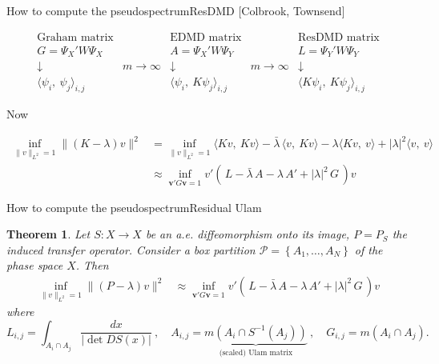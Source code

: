 \documentclass[
  english,            %
  aspectratio=169,    %
]{tumbeamer}
\newtheorem{theorem}{Theorem}
\newcommand{\cP}{\mathcal{P}}
\newcommand{\bv}{\mathbf{v}}
\begin{document}
\begin{frame}{How to compute the pseudospectrum}{ResDMD [Colbrook, Townsend]}
  
\begin{equation}
  \begin{matrix}
    \text{Graham matrix} & & \text{EDMD matrix} & & \text{ResDMD matrix} \\ 
    G = \Psi_X ' W \Psi_X &  &A = \Psi_X ' W \Psi_Y & &  L = \Psi_Y ' W \Psi_Y \\ 
    \downarrow & \scriptstyle{m \to \infty} & \downarrow & \scriptstyle{m \to \infty} & \downarrow \\ 
    \langle \psi_i,\ \psi_j \rangle_{i,j} & & \langle \psi_i,\ K\psi_j \rangle_{i,j} & & \langle K \psi_i,\ K \psi_j \rangle_{i,j}
  \end{matrix}
\end{equation}

Now

\begin{align}
  \inf_{\| v \|_{L^2} = 1} \| (K - \lambda) v \|^2 &= \inf_{\| v \|_{L^2} = 1} 
  \langle K v,\ K v \rangle - \bar{\lambda} \,\langle v,\ K v \rangle - \lambda \langle K v,\ v \rangle + |\lambda|^2 \langle v,\ v \rangle \\
  &\approx \inf_{\bv' G \bv = 1} v' (\, L - \bar{\lambda}\, A - \lambda\, A' + |\lambda|^2 \,G \,) v
\end{align}

\end{frame}

\begin{frame}{How to compute the pseudospectrum}{Residual Ulam}

\begin{theorem}
  Let $S : X \to X$ be an a.e. diffeomorphism onto its image, $P = P_S$ the induced transfer operator. Consider a box partition $\cP = \left\{ A_1, \ldots, A_N \right\}$ of the phase space $X$. Then 
  \begin{align}
    \inf_{\| v \|_{L^2} = 1} \| (P - \lambda) v \|^2 &\approx \inf_{\bv' G \bv = 1} v' (\, L - \bar{\lambda}\, A - \lambda\, A' + |\lambda|^2 \,G \,) v
  \end{align}
  where 
  \begin{equation}
    L_{i,j} = \int_{A_i \cap A_j} \frac{dx}{| \det DS (x) |}
    \ , \quad 
    A_{i,j} = \underbrace{m(A_i \cap S^{-1} (A_j))}_{\text{(scaled) Ulam matrix}}
    \ , \quad 
    G_{i,j} = m(A_i \cap A_j) . 
  \end{equation}
\end{theorem}
\end{frame}
\end{document}
